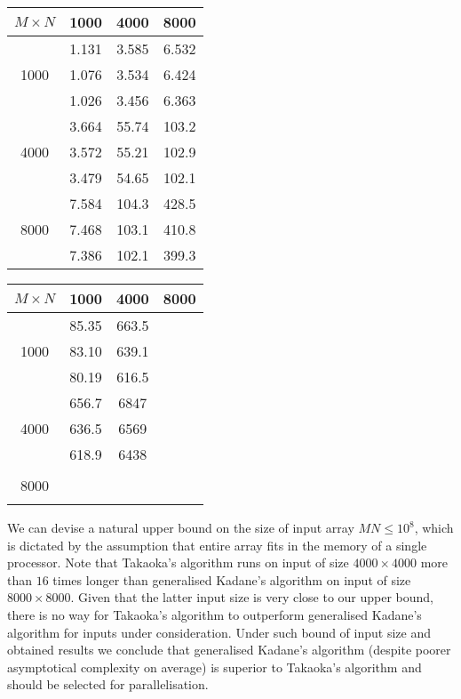 \begin{minipage}[h]{0.47\textwidth}
\centering
\begin{tabular}{c|c|c|c|}
$M \times N$ & 1000 & 4000 & 8000 \\
\hline
 & 1.131 & 3.585 & 6.532 \\
1000 & 1.076 & 3.534 & 6.424 \\
 & 1.026 & 3.456 & 6.363 \\
\hline
 & 3.664 & 55.74 & 103.2 \\
4000 & 3.572 & 55.21 & 102.9 \\
 & 3.479 & 54.65 & 102.1 \\
\hline
 & 7.584 & 104.3 & 428.5 \\
8000 & 7.468 & 103.1 & 410.8 \\
 & 7.386 & 102.1 & 399.3 \\
\hline
\end{tabular}
\end{minipage}
\hfill
\begin{minipage}[h]{0.47\textwidth}
\centering
\begin{tabular}{c|c|c|c|}
$M \times N$ & 1000 & 4000 & 8000 \\
\hline
 & 85.35 & 663.5 & \\
1000 & 83.10 & 639.1 & \\
 & 80.19 & 616.5 & \\
\hline
 & 656.7 & 6847 & \\
4000 & 636.5 & 6569 & \\
 & 618.9 & 6438 & \\
\hline
 &  &  & \\
8000 &  &  & \\
 &  &  & \\
\hline
\end{tabular}
\end{minipage}
\vspace{1em}

We can devise a natural upper bound on the size of input array $MN \leq 10^8$, which is dictated by the assumption that entire array fits in the memory of a single processor.
Note that Takaoka's algorithm runs on input of size $4000 \times 4000$ more than $16$ times longer than generalised Kadane's algorithm on input of size $8000 \times 8000$.
Given that the latter input size is very close to our upper bound, there is no way for Takaoka's algorithm to outperform generalised Kadane's algorithm for inputs under consideration.
Under such bound of input size and obtained results we conclude that generalised Kadane's algorithm (despite poorer asymptotical complexity on average) is superior to Takaoka's algorithm and should be selected for parallelisation.

